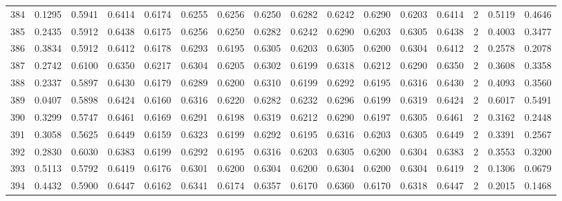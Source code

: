 \begin{tabular}{lrrrrrrrrrrrrrrr}
384 &      0.1295 &  0.5941 &  0.6414 &  0.6174 &  0.6255 &  0.6256 &  0.6250 &  0.6282 &  0.6242 &  0.6290 &   0.6203 &     0.6414 &      2 &                    0.5119 &                     0.4646 \\
385 &      0.2435 &  0.5912 &  0.6438 &  0.6175 &  0.6256 &  0.6250 &  0.6282 &  0.6242 &  0.6290 &  0.6203 &   0.6305 &     0.6438 &      2 &                    0.4003 &                     0.3477 \\
386 &      0.3834 &  0.5912 &  0.6412 &  0.6178 &  0.6293 &  0.6195 &  0.6305 &  0.6203 &  0.6305 &  0.6200 &   0.6304 &     0.6412 &      2 &                    0.2578 &                     0.2078 \\
387 &      0.2742 &  0.6100 &  0.6350 &  0.6217 &  0.6304 &  0.6205 &  0.6302 &  0.6199 &  0.6318 &  0.6212 &   0.6290 &     0.6350 &      2 &                    0.3608 &                     0.3358 \\
388 &      0.2337 &  0.5897 &  0.6430 &  0.6179 &  0.6289 &  0.6200 &  0.6310 &  0.6199 &  0.6292 &  0.6195 &   0.6316 &     0.6430 &      2 &                    0.4093 &                     0.3560 \\
389 &      0.0407 &  0.5898 &  0.6424 &  0.6160 &  0.6316 &  0.6220 &  0.6282 &  0.6232 &  0.6296 &  0.6199 &   0.6319 &     0.6424 &      2 &                    0.6017 &                     0.5491 \\
390 &      0.3299 &  0.5747 &  0.6461 &  0.6169 &  0.6291 &  0.6198 &  0.6319 &  0.6212 &  0.6290 &  0.6197 &   0.6305 &     0.6461 &      2 &                    0.3162 &                     0.2448 \\
391 &      0.3058 &  0.5625 &  0.6449 &  0.6159 &  0.6323 &  0.6199 &  0.6292 &  0.6195 &  0.6316 &  0.6203 &   0.6305 &     0.6449 &      2 &                    0.3391 &                     0.2567 \\
392 &      0.2830 &  0.6030 &  0.6383 &  0.6199 &  0.6292 &  0.6195 &  0.6316 &  0.6203 &  0.6305 &  0.6200 &   0.6304 &     0.6383 &      2 &                    0.3553 &                     0.3200 \\
393 &      0.5113 &  0.5792 &  0.6419 &  0.6176 &  0.6301 &  0.6200 &  0.6304 &  0.6200 &  0.6304 &  0.6200 &   0.6304 &     0.6419 &      2 &                    0.1306 &                     0.0679 \\
394 &      0.4432 &  0.5900 &  0.6447 &  0.6162 &  0.6341 &  0.6174 &  0.6357 &  0.6170 &  0.6360 &  0.6170 &   0.6318 &     0.6447 &      2 &                    0.2015 &                     0.1468 \\

\end{tabular}
